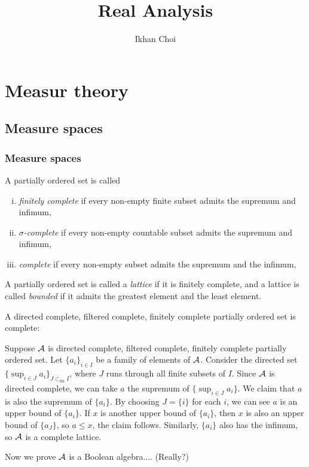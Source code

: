 \documentclass{../../large}
\begin{document}
\title{Real Analysis}
\author{Ikhan Choi}
\maketitle
\tableofcontents

\part{Measur theory}


\chapter{Measure spaces}


\section{Measure spaces}


\begin{prb}
A partially ordered set is called
\begin{enumerate}[(i)]
\item \emph{finitely complete} if every non-empty finite subset admits the supremum and infimum,
\item \emph{$\sigma$-complete} if every non-empty countable subset admits the supremum and infimum,
\item \emph{complete} if every non-empty subset admits the supremum and the infimum,
\end{enumerate}
A partially ordered set is called a \emph{lattice} if it is finitely complete, and a lattice is called \emph{bounded} if it admits the greatest element and the least element.
\begin{parts}
\item 
\end{parts}
\end{prb}
\begin{pf}

A directed complete, filtered complete, finitely complete partially ordered set is complete:

Suppose $\mathcal{A}$ is directed complete, filtered complete, finitely complete partially ordered set. 
Let $\{a_i\}_{i\in I}$ be a family of elements of $\mathcal{A}$.
Consider the directed set $\{\sup_{i\in J}a_i\}_{J\subset_{\mathrm{fin}}I}$, where $J$ runs through all finite subsets of $I$.
Since $\mathcal{A}$ is directed complete, we can take $a$ the supremum of $\{\sup_{i\in J}a_i\}$.
We claim that $a$ is also the supremum of $\{a_i\}$.
By choosing $J=\{i\}$ for each $i$, we can see $a$ is an upper bound of $\{a_i\}$.
If $x$ is another upper bound of $\{a_i\}$, then $x$ is also an upper bound of $\{a_J\}$, so $a\le x$, the claim follows.
Similarly, $\{a_i\}$ also has the infimum, so $\mathcal{A}$ is a complete lattice.

Now we prove $\mathcal{A}$ is a Boolean algebra....
(Really?)
\end{pf}
\end{document}
